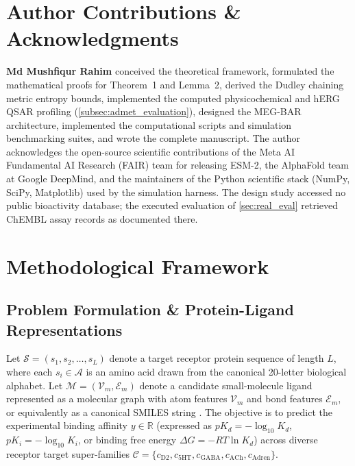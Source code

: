 \documentclass{article}
\theoremstyle{definition}
\begin{document}
\section*{Author Contributions \& Acknowledgments}
\textbf{Md Mushfiqur Rahim} conceived the theoretical framework, formulated the mathematical proofs for Theorem~1 and Lemma~2, derived the Dudley chaining metric entropy bounds, implemented the computed physicochemical and hERG QSAR profiling (\cref{subsec:admet_evaluation}), designed the MEG-BAR architecture, implemented the computational scripts and simulation benchmarking suites, and wrote the complete manuscript. The author acknowledges the open-source scientific contributions of the Meta AI Fundamental AI Research (FAIR) team for releasing ESM-2, the AlphaFold team at Google DeepMind, and the maintainers of the Python scientific stack (NumPy, SciPy, Matplotlib) used by the simulation harness. The design study accessed no public bioactivity database; the executed evaluation of \cref{sec:real_eval} retrieved ChEMBL assay records as documented there.




\newpage
\appendix
\section{Methodological Framework}
\label{sec:methodology}

\subsection{Problem Formulation \& Protein-Ligand Representations}
Let $\mathcal{S} = (s_1, s_2, \dots, s_L)$ denote a target receptor protein sequence of length $L$, where each $s_i \in \mathcal{A}$ is an amino acid drawn from the canonical 20-letter biological alphabet. Let $\mathcal{M} = (\mathcal{V}_m, \mathcal{E}_m)$ denote a candidate small-molecule ligand represented as a molecular graph with atom features $\mathcal{V}_m$ and bond features $\mathcal{E}_m$, or equivalently as a canonical SMILES string \citep{landrum2023rdkit}. The objective is to predict the experimental binding affinity $y \in \mathbb{R}$ (expressed as $pK_d = -\log_{10} K_d$, $pK_i = -\log_{10} K_i$, or binding free energy $\Delta G = -RT \ln K_d$) across diverse receptor target super-families $\mathcal{C} = \{c_{\text{D2}}, c_{\text{5HT}}, c_{\text{GABA}}, c_{\text{ACh}}, c_{\text{Adren}}\}$.
\end{document}
